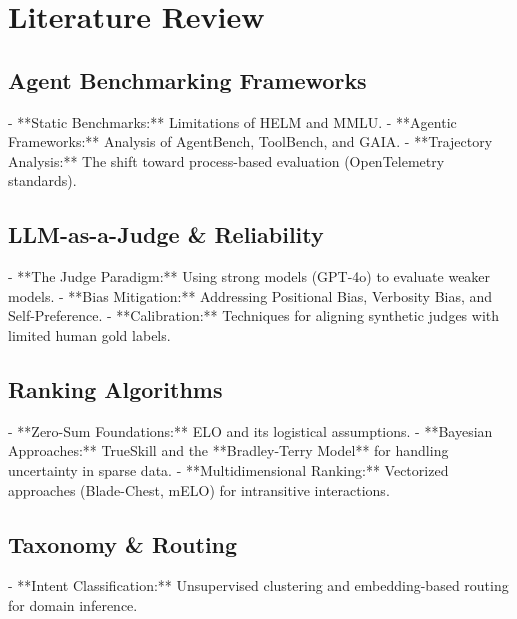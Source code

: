 \chapter{Literature Review}\label{ch:literature-review}


\section{Agent Benchmarking Frameworks}\label{sec:agent-benchmarking-frameworks}
- **Static Benchmarks:** Limitations of HELM and MMLU.
- **Agentic Frameworks:** Analysis of AgentBench, ToolBench, and GAIA.
- **Trajectory Analysis:** The shift toward process-based evaluation (OpenTelemetry standards).
\section{LLM-as-a-Judge \& Reliability}\label{sec:llm-as-a-judge-&-reliability}
- **The Judge Paradigm:** Using strong models (GPT-4o) to evaluate weaker models.
- **Bias Mitigation:** Addressing Positional Bias, Verbosity Bias, and Self-Preference.
- **Calibration:** Techniques for aligning synthetic judges with limited human gold labels.
\section{Ranking Algorithms}\label{sec:ranking-algorithms}
- **Zero-Sum Foundations:** ELO and its logistical assumptions.
- **Bayesian Approaches:** TrueSkill and the **Bradley-Terry Model** for handling uncertainty in sparse data.
- **Multidimensional Ranking:** Vectorized approaches (Blade-Chest, mELO) for intransitive interactions.
\section{Taxonomy \& Routing}\label{sec:taxonomy-&-routing}
- **Intent Classification:** Unsupervised clustering and embedding-based routing for domain inference.